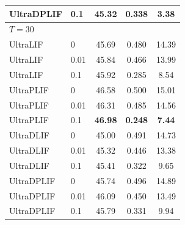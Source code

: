 \documentclass{article}
\theoremstyle{plain}
\theoremstyle{definition}
\theoremstyle{remark}
\begin{document}
\begin{table}[h]
\begin{center}
\begin{small}
\begin{tabular}{llccc}
UltraDPLIF & 0.1  & 45.32 & 0.338 & 3.38 \\
\midrule
\multicolumn{5}{l}{\textit{$T{=}30$}} \\
UltraLIF   & 0    & 45.69 & 0.480 & 14.39 \\
UltraLIF   & 0.01 & 45.84 & 0.466 & 13.99 \\
UltraLIF   & 0.1  & 45.92 & 0.285 & 8.54 \\
UltraPLIF  & 0    & 46.58 & 0.500 & 15.01 \\
UltraPLIF  & 0.01 & 46.31 & 0.485 & 14.56 \\
UltraPLIF  & 0.1  & \textbf{46.98} & \textbf{0.248} & \textbf{7.44} \\
UltraDLIF  & 0    & 45.00 & 0.491 & 14.73 \\
UltraDLIF  & 0.01 & 45.32 & 0.446 & 13.38 \\
UltraDLIF  & 0.1  & 45.41 & 0.322 & 9.65 \\
UltraDPLIF & 0    & 45.74 & 0.496 & 14.89 \\
UltraDPLIF & 0.01 & 46.09 & 0.450 & 13.49 \\
UltraDPLIF & 0.1  & 45.79 & 0.331 & 9.94 \\
\bottomrule
\end{tabular}
\end{small}
\end{center}
\vskip -0.1in
\end{table}
\end{document}

